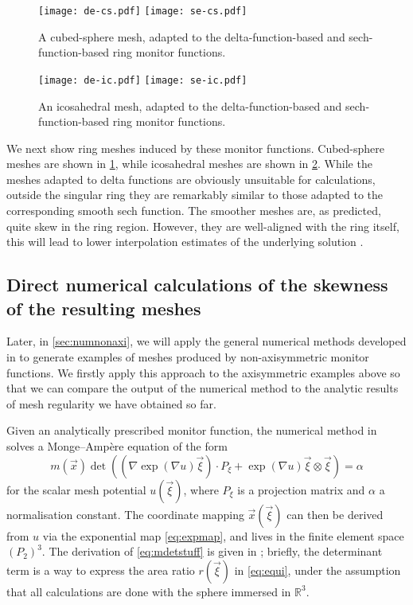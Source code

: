 \documentclass[11pt, a4paper]{scrartcl}  %
\theoremstyle{plain}
\theoremstyle{definition}
\numberwithin{equation}{section}
\begin{document}
\begin{figure}[!tb]
  \centering
  \texttt{[image: de-cs.pdf]}
  \texttt{[image: se-cs.pdf]}
  \caption{A cubed-sphere mesh, adapted to the delta-function-based and
sech-function-based ring monitor functions.}
\label{fig:ri-cs-meshes}
\end{figure}

\begin{figure}[!tb]
  \centering
  \texttt{[image: de-ic.pdf]}
  \texttt{[image: se-ic.pdf]}
  \caption{An icosahedral mesh, adapted to the delta-function-based and
sech-function-based ring monitor functions.}
\label{fig:ri-ic-meshes}
\end{figure}

We next show ring meshes induced by these monitor functions.
Cubed-sphere meshes are shown in \cref{fig:ri-cs-meshes}, while
icosahedral meshes are shown in \cref{fig:ri-ic-meshes}. While the
meshes adapted to delta functions are obviously unsuitable for
calculations, outside the singular ring they are remarkably similar to
those adapted to the corresponding smooth sech function. The smoother
meshes are, as predicted, quite skew in the ring region. However,
they are well-aligned with the ring itself, this will lead to lower
interpolation estimates of the underlying solution \citep{huang2011adaptive}.

\subsection{Direct numerical calculations of the skewness of the resulting meshes}
\label{ssec:numaxi4}

Later, in \cref{sec:numnonaxi}, we will apply the general numerical
methods developed in \citet{mcrae2018optimal} to generate examples of
meshes produced by non-axisymmetric monitor functions. We firstly apply
this approach to the axisymmetric examples above so that we can compare
the output of the numerical method to the analytic results of mesh
regularity we have obtained so far.

Given an analytically prescribed monitor function, the numerical method
in \citet{mcrae2018optimal} solves a Monge--Ampère equation of the form
\begin{equation}
\label{eq:mdetstuff}
m(\vec{x}) \det \left((\nabla\exp(\nabla u)\vec{\xi})\cdot P_\xi + \exp(\nabla u)\vec{\xi}\otimes\vec{\xi}\right) = \alpha
\end{equation}
for the scalar mesh potential $u(\vec{\xi})$, where $P_\xi$ is a
projection matrix and $\alpha$ a normalisation constant. The coordinate
mapping $\vec{x}(\vec{\xi})$ can then be derived from $u$ via the
exponential map \cref{eq:expmap}, and lives in the finite element space
$(P_2)^3$. The derivation of \cref{eq:mdetstuff} is given in
\citet{mcrae2018optimal}; briefly, the determinant term is a way to
express the area ratio $r(\vec{\xi})$ in \cref{eq:equi}, under the
assumption that all calculations are done with the sphere immersed in
$\mathbb{R}^3$.
\end{document}
